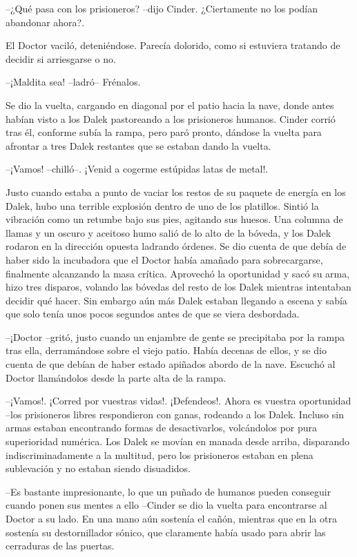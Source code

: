--¿Qué pasa con los prisioneros? --dijo Cinder. ¿Ciertamente no los podían abandonar ahora?.
 
El Doctor vaciló, deteniéndose. Parecía dolorido, como si estuviera tratando de decidir si arriesgarse o no. 

--¡Maldita sea! --ladró-- Frénalos.
 
Se dio la vuelta, cargando en diagonal por el patio hacia la nave, donde antes habían visto a los Dalek pastoreando a los prisioneros humanos.
Cinder corrió tras él, conforme subía la rampa, pero paró pronto, dándose la vuelta para afrontar a tres Dalek restantes que se estaban dando la vuelta. 

--¡Vamos! --chilló--. ¡Venid a cogerme estúpidas latas de metal!.
 
Justo cuando estaba a punto de vaciar los restos de su paquete de energía en los Dalek, hubo una terrible explosión dentro de uno de los platillos. Sintió la vibración como un retumbe bajo sus pies, agitando sus huesos.
Una columna de llamas y un oscuro y aceitoso humo salió de lo alto de la bóveda, y los Dalek rodaron en la dirección opuesta ladrando órdenes. Se dio cuenta de que debía de haber sido la incubadora que el Doctor había amañado para sobrecargarse, finalmente alcanzando la masa crítica.
Aprovechó la oportunidad y sacó su arma, hizo tres disparos, volando las bóvedas del resto de los Dalek mientras intentaban decidir qué hacer.
Sin embargo aún más Dalek estaban llegando a escena y sabía que solo tenía unos pocos segundos antes de que se viera desbordada.

--¡Doctor --gritó, justo cuando un enjambre de gente se precipitaba por la rampa tras ella, derramándose sobre el viejo patio. Había decenas de ellos, y se dio cuenta de que debían de haber estado apiñados abordo de la nave.
Escuchó al Doctor llamándolos desde la parte alta de la rampa. 

--¡Vamos!. ¡Corred por vuestras vidas!. ¡Defendeos!. Ahora es vuestra oportunidad --los prisioneros libres respondieron con ganas, rodeando a los Dalek. Incluso sin armas estaban encontrando formas de desactivarlos, volcándolos por pura superioridad numérica. 
Los Dalek se movían en manada desde arriba, disparando indiscriminadamente a la multitud, pero los prisioneros estaban en plena sublevación y no estaban siendo disuadidos.

--Es bastante impresionante, lo que un puñado de humanos pueden conseguir cuando ponen sus mentes a ello --Cinder se dio la vuelta para encontrarse al Doctor a su lado. En una mano aún sostenía el cañón, mientras que en la otra sostenía su destornillador sónico, que claramente había usado para abrir las cerraduras de las puertas. 

